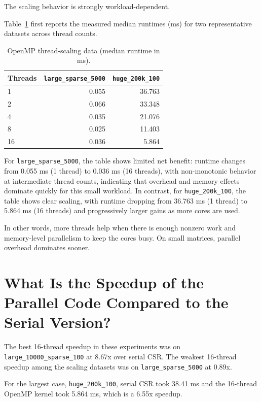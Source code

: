 \documentclass{article}
\begin{document}
The scaling behavior is strongly workload-dependent.

Table~\ref{tab:thread-scaling-data} first reports the measured median runtimes (ms) for two representative datasets across thread counts.

\begin{table}[h]
  \centering
  \begin{tabular}{lrr}
    \toprule
    Threads & \texttt{large\_sparse\_5000} & \texttt{huge\_200k\_100} \\
    \midrule
    1  & 0.055 & 36.763 \\
    2  & 0.066 & 33.348 \\
    4  & 0.035 & 21.076 \\
    8  & 0.025 & 11.403 \\
    16 & 0.036 & 5.864 \\
    \bottomrule
  \end{tabular}
  \caption{OpenMP thread-scaling data (median runtime in ms).}
  \label{tab:thread-scaling-data}
\end{table}

For \texttt{large\_sparse\_5000}, the table shows limited net benefit: runtime changes from 0.055 ms (1 thread) to 0.036 ms (16 threads), with non-monotonic behavior at intermediate thread counts, indicating that overhead and memory effects dominate quickly for this small workload. In contrast, for \texttt{huge\_200k\_100}, the table shows clear scaling, with runtime dropping from 36.763 ms (1 thread) to 5.864 ms (16 threads) and progressively larger gains as more cores are used.

In other words, more threads help when there is enough nonzero work and memory-level parallelism to keep the cores busy. On small matrices, parallel overhead dominates sooner.

\section{What Is the Speedup of the Parallel Code Compared to the Serial Version?}

The best 16-thread speedup in these experiments was on \texttt{large\_10000\_sparse\_100} at 8.67x over serial CSR. The weakest 16-thread speedup among the scaling datasets was on \texttt{large\_sparse\_5000} at 0.89x.

For the largest case, \texttt{huge\_200k\_100}, serial CSR took 38.41 ms and the 16-thread OpenMP kernel took 5.864 ms, which is a 6.55x speedup.
\end{document}
